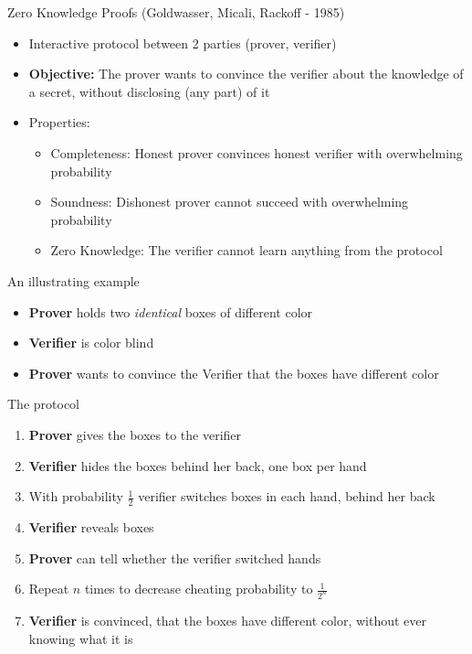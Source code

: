 \documentclass{beamer}
\begin{document}
\begin{frame}[allowframebreaks]{Zero Knowledge Proofs (Goldwasser, Micali, Rackoff - 1985)}
 \begin{itemize}
\item Interactive protocol between 2 parties (prover, verifier)
\item \textbf{Objective:} The prover wants to convince the verifier about the knowledge of a secret, without disclosing (any part) of it
\item Properties:
\begin{itemize}
\item Completeness: Honest prover convinces honest verifier with overwhelming probability
\item Soundness: Dishonest prover cannot succeed with overwhelming probability
\item Zero Knowledge: The verifier cannot learn anything from the protocol
\end{itemize} 
\end{itemize} 

\begin{block}{An illustrating example}
\begin{itemize}
\item \textbf{Prover} holds two \textit{identical} boxes of different color
\item \textbf{Verifier} is color blind
\item \textbf{Prover} wants to convince the Verifier that the boxes have different color
\end{itemize}
\end{block}

\begin{block}{The protocol}
\begin{enumerate}
\item \textbf{Prover} gives the boxes to the verifier
\item \textbf{Verifier} hides the boxes behind her back, one box per hand
\item With probability $\frac{1}{2}$ verifier switches boxes in each hand, behind her back
\item \textbf{Verifier} reveals boxes
\item \textbf{Prover} can tell whether the verifier switched hands
\item Repeat $n$ times to decrease cheating probability to $\frac{1}{2^n}$
\item \textbf{Verifier} is convinced, that the boxes have different color, without ever knowing what it is
\end{enumerate}
\end{block}
\end{frame}
\end{document}
